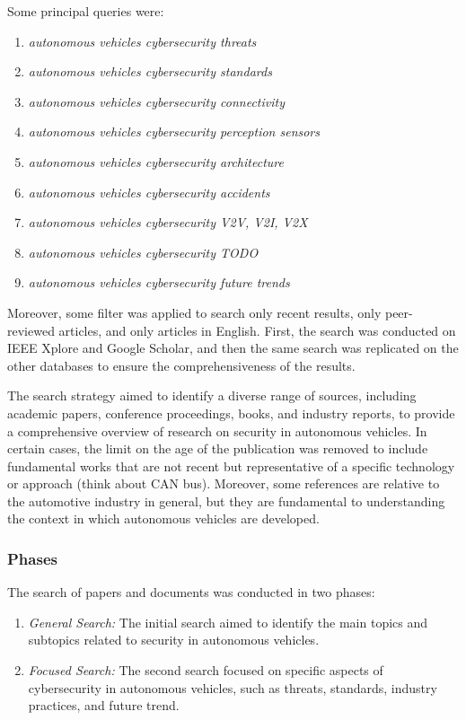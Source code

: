Some principal queries were:
\begin{enumerate}
    \item \textit{autonomous vehicles cybersecurity threats}
    \item \textit{autonomous vehicles cybersecurity standards}
    \item \textit{autonomous vehicles cybersecurity connectivity}
    \item \textit{autonomous vehicles cybersecurity perception sensors}
    \item \textit{autonomous vehicles cybersecurity architecture}
    \item \textit{autonomous vehicles cybersecurity accidents}
    \item \textit{autonomous vehicles cybersecurity V2V, V2I, V2X}
    \item \textit{autonomous vehicles cybersecurity TODO}
    \item \textit{autonomous vehicles cybersecurity future trends}
\end{enumerate}

Moreover, some filter was applied to search only recent results, only peer-reviewed articles, and only articles in English.
First, the search was conducted on IEEE Xplore and Google Scholar, and then the same search was replicated on the other databases to ensure the comprehensiveness of the results.

The search strategy aimed to identify a diverse range of sources, including academic papers, conference proceedings, books, and industry reports, to provide a comprehensive overview of research on security in autonomous vehicles.
In certain cases, the limit on the age of the publication was removed to include fundamental works that are not recent but representative of a specific technology or approach (think about CAN bus).
Moreover, some references are relative to the automotive industry in general, but they are fundamental to understanding the context in which autonomous vehicles are developed.

\subsubsection{Phases}\label{subsubsec:phases}
The search of papers and documents was conducted in two phases:
\begin{enumerate}
    \item \textit{General Search:} The initial search aimed to identify the main topics and subtopics related to security in autonomous vehicles.
    \item \textit{Focused Search:} The second search focused on specific aspects of cybersecurity in autonomous vehicles, such as threats, standards, industry practices, and future trend.
\end{enumerate}

